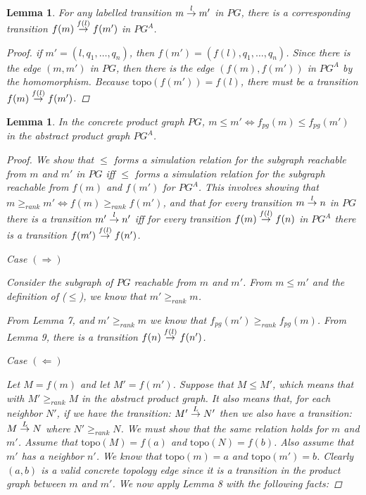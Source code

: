 \documentclass[twocolumn, openany]{sig-alternate-10pt}
\newcommand{\Topo}{\ensuremath{\mathrm{topo}}}
\newtheorem{lem}[thm]{Lemma}
\begin{document}
\begin{lem}
  For any labelled transition $\trans{m}{m'}{l}$ in $PG$, there is a corresponding transition $\trans{f(m)}{f(m')}{f(l)}$ in $PG^A$.
  \begin{proof}
    if $m' = (l, q_1, \ldots, q_n)$, then $f(m') = (f(l), q_1, \ldots, q_n)$. Since there is the edge $(m,m')$ in $PG$, then there is the edge $(f(m),f(m'))$ in $PG^A$ by the homomorphism. Because $\Topo(f(m')) = f(l)$, there must be a transition $\trans{f(m)}{f(m')}{f(l)}$.
  \end{proof}
\end{lem}



\vspace{.4em}
\begin{lem}
  In the concrete product graph $PG$, $m \leq m' \iff f_{pg}(m) \leq f_{pg}(m')$ in the abstract product graph $PG^A$.
  \begin{proof} 
    We show that $\leq$ forms a simulation relation for the subgraph reachable from $m$ and $m'$ in $PG$ iff $\leq$ forms a simulation relation for the subgraph reachable from $f(m)$ and $f(m')$ for $PG^A$. This involves showing that $m \geq_{rank} m' \iff f(m) \geq_{rank} f(m')$, and that 
    for every transition $\trans{m}{n}{l}$ in $PG$ there is a transition $\trans{m'}{n'}{l}$ iff for every transition $\trans{f(m)}{f(n)}{f(l)}$ in $PG^A$ there is a transition $\trans{f(m')}{f(n')}{f(l)}$.

    \vspace{1.4em}
    \noindent
    \emph{Case} $(\Rightarrow)$

    \vspace{.4em}
    Consider the subgraph of $PG$ reachable from $m$ and $m'$. From $m \leq m'$ and the definition of ($\leq$), we know that $m' \geq_{rank} m$. 

    \noindent
    From Lemma 7, and $m' \geq_{rank} m$ we know that $f_{pg}(m') \geq_{rank} f_{pg}(m)$. 
    From Lemma 9, there is a transition $\trans{f(n)}{f(n')}{f(l)}$.

    \vspace{1.2em}
    \noindent
    \emph{Case} $(\Leftarrow)$

    \vspace{.4em}
    Let $M = f(m)$ and let $M' = f(m')$.
    Suppose that $M \leq M'$, which means that with $M' \geq_{rank} M$ in the abstract product graph. It also means that, for each neighbor $N'$, if we have the transition: $\trans{M'}{N'}{L}$ then we also have a transition: $\trans{M}{N}{L}$ where $N' \geq_{rank} N$. We must show that the same relation holds for $m$ and $m'$. 
    Assume that $\Topo(M) = f(a)$ and $\Topo(N) = f(b)$. Also assume that $m'$ has a neighbor $n'$. We know that $\Topo(m) = a$ and $\Topo(m') = b$. Clearly $(a,b)$ is a valid concrete topology edge since it is a transition in the product graph between $m$ and $m'$. We now apply Lemma 8 with the following facts:


\end{proof}
\end{lem}
\end{document}
